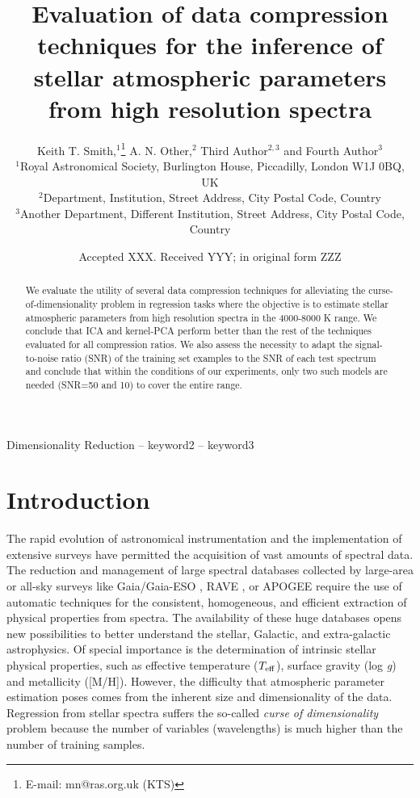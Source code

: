 \documentclass[a4paper,fleqn,usenatbib]{mnras}
\title[Short title, max. 45 characters]{Evaluation of data compression techniques for the inference of
  stellar atmospheric parameters from high resolution spectra}
\author[K. T. Smith et al.]{
Keith T. Smith,$^{1}$\thanks{E-mail: mn@ras.org.uk (KTS)}
A. N. Other,$^{2}$
Third Author$^{2,3}$
and Fourth Author$^{3}$
\\
$^{1}$Royal Astronomical Society, Burlington House, Piccadilly, London W1J 0BQ, UK\\
$^{2}$Department, Institution, Street Address, City Postal Code, Country\\
$^{3}$Another Department, Different Institution, Street Address, City Postal Code, Country
}
\date{Accepted XXX. Received YYY; in original form ZZZ}
\begin{document}
\label{firstpage}
\pagerange{\pageref{firstpage}--\pageref{lastpage}}
\maketitle

\begin{abstract}
We evaluate the utility of several data compression techniques
  for alleviating the curse-of-dimensionality problem in regression
  tasks where the objective is to estimate stellar atmospheric
  parameters from high resolution spectra in the 4000-8000 K range. We
  conclude that ICA and kernel-PCA perform better than the rest of the
  techniques evaluated for all compression ratios. We also assess the
  necessity to adapt the signal-to-noise ratio (SNR) of the training
  set examples to the SNR of each test spectrum and conclude that
  within the conditions of our experiments, only two such models are
  needed (SNR=50 and 10) to cover the entire range.
\end{abstract}

\begin{keywords}
Dimensionality Reduction -- keyword2 -- keyword3
\end{keywords}



\section{Introduction}

The rapid evolution of astronomical instrumentation and the
implementation of extensive surveys have permitted the acquisition of
vast amounts of spectral data.  The reduction and management of large
spectral databases collected by large-area or all-sky surveys like
Gaia/Gaia-ESO \citep{2006MNRAS.367..290J,2012Msngr.147...25G}, RAVE
\citep{2006AJ....132.1645S}, or APOGEE \citep{2011AJ....142...72E}
require the use of automatic techniques for the consistent,
homogeneous, and efficient extraction of physical properties from
spectra. The availability of these huge databases opens new
possibilities to better understand the stellar, Galactic, and
extra-galactic astrophysics. Of special importance is the
determination of intrinsic stellar physical properties, such as
effective temperature ($T_{\rm eff}$), surface gravity (log
\textit{g}) and metallicity ([M/H]). However, the difficulty that
atmospheric parameter estimation poses comes from the inherent size
and dimensionality of the data.  Regression from stellar spectra
suffers the so-called {\sl curse of dimensionality} problem because
the number of variables (wavelengths) is much higher than the number
of training samples. 
    
\end{document}
